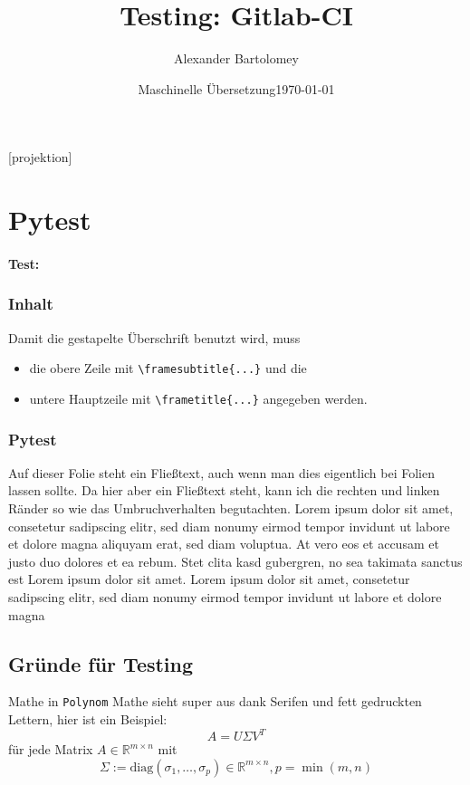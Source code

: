 \documentclass[t]{beamer}
\title{Testing: Gitlab-CI}
\date[Polynom]{Maschinelle Übersetzung\enskip\enskip\today}
\author{Alexander Bartolomey}
\institute[Polynom]{Polynom Aachen University}
\begin{document}
[projektion]{}

\begin{frame}[plain]
  \titlepage{}
\end{frame}

\section{Pytest}

\begin{frame}[fragile]
  \framesubtitle{Test:}
  \frametitle{Inhalt}
  Damit die gestapelte Überschrift benutzt wird, muss \begin{itemize}
    \item die obere Zeile mit \verb|\framesubtitle{...}| und die
    \item untere Hauptzeile mit \verb|\frametitle{...}| angegeben werden.
  \end{itemize} 
\end{frame}

\begin{frame}
  \frametitle{Pytest}
  Auf dieser Folie steht ein Fließtext, auch wenn man dies eigentlich
  bei Folien lassen sollte.  Da hier aber ein Fließtext steht, kann
  ich die rechten und linken Ränder so wie das Umbruchverhalten begutachten. 
  Lorem ipsum dolor sit amet, consetetur sadipscing elitr, sed diam nonumy eirmod 
  tempor invidunt ut labore et dolore magna aliquyam erat, sed diam voluptua. 
  At vero eos et accusam et justo duo dolores et ea rebum. Stet clita kasd gubergren, 
  no sea takimata sanctus est Lorem ipsum dolor sit amet. Lorem ipsum dolor sit amet, 
  consetetur sadipscing elitr, sed diam nonumy eirmod tempor invidunt ut labore 
  et dolore magna
\end{frame}

\subsection{Gründe für Testing}

\begin{frame}{Mathe in \texttt{Polynom}}
  Mathe sieht super aus dank Serifen und fett gedruckten Lettern, hier ist ein Beispiel:
  \[A = U\Sigma V^T\]
  für jede Matrix \(A \in \mathbb{R}^{m\times n}\) mit \[\Sigma:=\mathrm{diag}(\sigma_1,\dots,\sigma_p) \in \mathbb{R}^{m\times n}, p = \min(m,n)\]
\end{frame}
\end{document}

